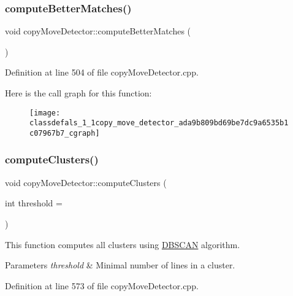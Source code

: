 \subsubsection{\texorpdfstring{compute\+Better\+Matches()}{computeBetterMatches()}}
{\footnotesize\ttfamily void copy\+Move\+Detector\+::compute\+Better\+Matches (\begin{DoxyParamCaption}{ }\end{DoxyParamCaption})\hspace{0.3cm}{\ttfamily [private]}}



Definition at line 504 of file copy\+Move\+Detector.\+cpp.

Here is the call graph for this function\+:\nopagebreak
\begin{figure}[H]
\begin{center}
\leavevmode
\texttt{[image: classdefals\_1\_1copy\_move\_detector\_ada9b809bd69be7dc9a6535b1c07967b7\_cgraph]}
\end{center}
\end{figure}
\mbox{\label{classdefals_1_1copy_move_detector_a34d3aafc7e8cfacab0a1f2aa0d45d655}} 
\subsubsection{\texorpdfstring{compute\+Clusters()}{computeClusters()}}
{\footnotesize\ttfamily void copy\+Move\+Detector\+::compute\+Clusters (\begin{DoxyParamCaption}\item[{int}]{threshold = {} }\end{DoxyParamCaption})\hspace{0.3cm}{\ttfamily [private]}}

This function computes all clusters using \hyperlink{class_d_b_s_c_a_n}{D\+B\+S\+C\+AN} algorithm.


\begin{DoxyParams}{Parameters}
{\em threshold} & Minimal number of lines in a cluster. \\
\hline
\end{DoxyParams}


Definition at line 573 of file copy\+Move\+Detector.\+cpp.


